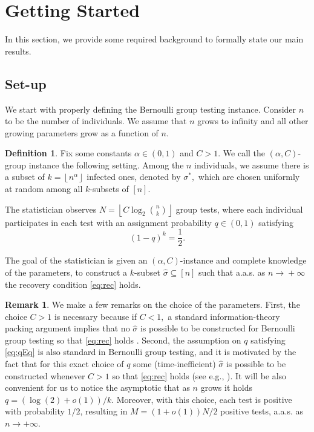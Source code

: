 \documentclass[12pt,reqno]{amsart}
\numberwithin{equation}{section}
\theoremstyle{definition}
\newtheorem{definition}[theorem]{Definition}
\newtheorem{remark}[theorem]{Remark}
\newcommand{\floor}[1]{\left\lfloor #1 \right\rfloor}
\newcommand{\conv}[1]{\overset{#1}{\rightarrow}}
\renewcommand{\[}{\begin{equation}}
\renewcommand{\]}{\end{equation}}
\renewcommand{\|}{\bigg{|}}
\newcommand{\ngrow}{\ensuremath{n \conv{} +\infty} }
\begin{document}


\section{Getting Started}\label{sec:set_up}
In this section, we provide some required background to formally state our main results.
\subsection{Set-up}\label{sec:setup} We start with properly defining the Bernoulli group testing instance. Consider \(n\) to be the number of individuals. We assume that $n$ grows to infinity and all other growing parameters grow as a function of $n.$  

\begin{definition} Fix some constants $\alpha \in (0,1)$ and $C>1$. We call the $(\alpha,C)$-group instance the following setting. Among the $n$ individuals, we assume there is a subset of $k=\floor{n^{\alpha}}$ infected ones, denoted by $\sigma^*,$ which are chosen uniformly at random among all $k$-subsets of $[n]$. 

The statistician observes \(N = \floor{C  \log_2 \binom{n}{k}}\) group tests, where each individual participates in each test with an assignment probability \(q \in (0,1)\) satisfying
\[
(1-q)^k = \frac{1}{2}.
\label{eq:qEq}\]
\end{definition}The goal of the statistician is given an $(\alpha,C)$-instance and complete knowledge of the parameters, to construct a $k$-subset $\hat{\sigma} \subseteq [n]$ such that a.a.s. as \ngrow the recovery condition \eqref{eq:rec} holds.

\begin{remark}
    We make a few remarks on the choice of the parameters.  First, the choice $C>1$ is necessary because if $C<1,$ a standard information-theory packing argument implies that no $\hat{\sigma}$ is possible to be constructed for Bernoulli group testing so that \eqref{eq:rec} holds \cite{Aldridge_2019}. Second, the assumption on $q$ satisfying \eqref{eq:qEq} is also standard in Bernoulli group testing, and it is motivated by the fact that for this exact choice of $q$ some (time-inefficient) $\hat{\sigma}$ is possible to be constructed whenever $C>1$ so that \eqref{eq:rec} holds (see e.g., \cite[Lemma 5]{iliopoulos2021group}). It will be also convenient for us to notice the asymptotic that as \(n\) grows it holds \(q = (\log(2)+o(1))/k\). Moreover, with this choice, each test is positive with probability \(1/2\), resulting in \(M = (1+o(1))N/2\) positive tests, a.a.s. as $n \rightarrow +\infty.$
\end{remark}
\end{document}
